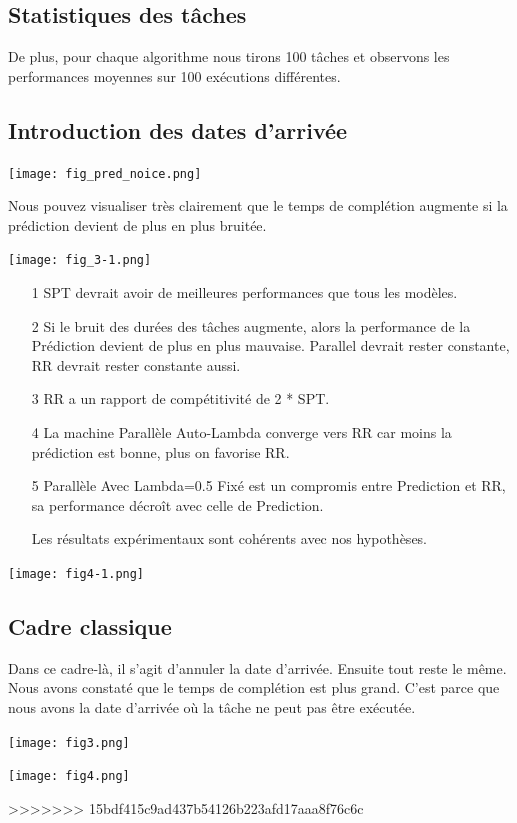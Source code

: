 \documentclass[12pt]{article}
\begin{document}
    \subsection{Statistiques des tâches}
    
    \begin{figure}
        \centering
        \label{fig:foobar}
    \end{figure}

    

    De plus, pour chaque algorithme nous tirons 100 tâches et observons les performances moyennes sur 100 exécutions différentes.

    \subsection{Introduction des dates d'arrivée}
    
    \texttt{[image: fig\_pred\_noice.png]}
    
    Nous pouvez visualiser très clairement que le temps de complétion augmente si la prédiction devient de plus en plus bruitée.
    
        
    \texttt{[image: fig\_3-1.png]}
    
    
    \begin{itemize}
        \item[1] SPT devrait avoir de meilleures performances que tous les modèles.
        \item[2] Si le bruit des durées des tâches augmente, alors la performance de la Prédiction devient de plus en plus mauvaise. Parallel devrait rester constante, RR devrait rester constante aussi.
        \item[3] RR a un rapport de compétitivité de 2 * SPT.
        \item[4] La machine Parallèle Auto-Lambda converge vers RR car moins la prédiction est bonne, plus on favorise RR.
        \item[5] Parallèle Avec Lambda=0.5 Fixé est un compromis entre Prediction et RR, sa performance décroît avec celle de Prediction.
  
    
    Les résultats expérimentaux sont cohérents avec nos hypothèses.
    \end{itemize}
    
    \texttt{[image: fig4-1.png]}
    
    \subsection{Cadre classique}
    
    Dans ce cadre-là, il s'agit d'annuler la date d'arrivée. Ensuite tout reste le même. Nous avons constaté que le temps de complétion est plus grand. C'est parce que nous avons la date d'arrivée où la tâche ne peut pas être exécutée.
    
    \texttt{[image: fig3.png]}
    
    \texttt{[image: fig4.png]}
    
    
>>>>>>> 15bdf415c9ad437b54126b223afd17aaa8f76c6c
\end{document}

